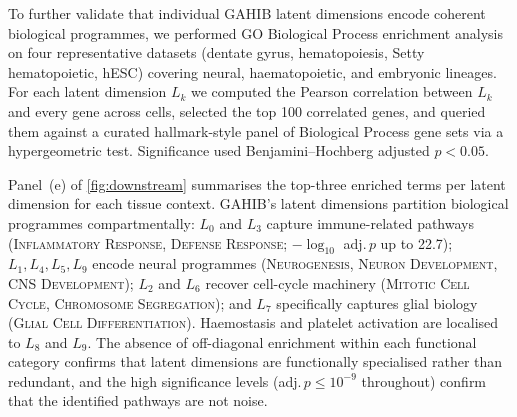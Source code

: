 \documentclass[preprint,12pt]{elsarticle}
\begin{document}
To further validate that individual GAHIB latent dimensions encode
coherent biological programmes, we performed GO Biological Process
enrichment analysis on four representative datasets (dentate gyrus,
hematopoiesis, Setty hematopoietic, hESC) covering neural,
haematopoietic, and embryonic lineages.
For each latent dimension $L_k$ we computed the Pearson correlation
between $L_k$ and every gene across cells, selected the top 100
correlated genes, and queried them against a curated hallmark-style
panel of Biological Process gene sets via a hypergeometric test.
Significance used Benjamini--Hochberg adjusted $p{<}0.05$.

Panel~(e) of \cref{fig:downstream} summarises the top-three
enriched terms per latent dimension for each tissue context.
GAHIB's latent dimensions partition biological programmes
compartmentally:
$L_0$ and $L_3$ capture immune-related pathways
(\textsc{Inflammatory Response}, \textsc{Defense Response};
$-\log_{10}$ adj.\,$p$ up to 22.7);
$L_1, L_4, L_5, L_9$ encode neural programmes
(\textsc{Neurogenesis}, \textsc{Neuron Development},
\textsc{CNS Development});
$L_2$ and $L_6$ recover cell-cycle machinery
(\textsc{Mitotic Cell Cycle}, \textsc{Chromosome Segregation});
and $L_7$ specifically captures glial biology
(\textsc{Glial Cell Differentiation}).
Haemostasis and platelet activation are localised to $L_8$ and $L_9$.
The absence of off-diagonal enrichment within each functional
category confirms that latent dimensions are functionally specialised
rather than redundant, and the high significance levels
(adj.\,$p\leq 10^{-9}$ throughout) confirm that the identified
pathways are not noise.
\end{document}
